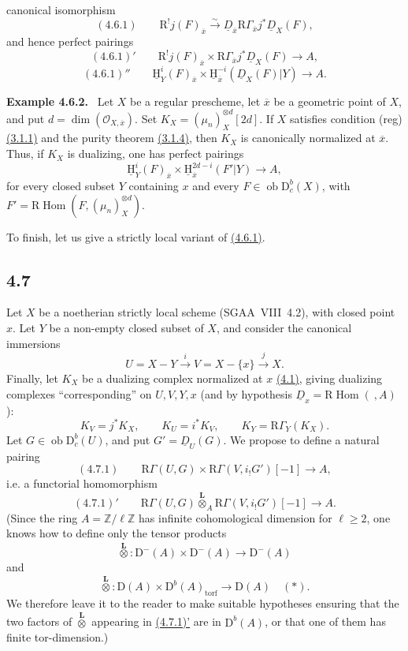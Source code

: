 \documentclass[11pt]{article}
\providecommand{\cO}{\mathcal{O}}
\providecommand{\uH}{\underline{\mathrm H}}
\newenvironment{statement}[1]{\par\medskip\noindent\textbf{#1.}\ }{\par\medskip}
\DeclareMathOperator{\Hom}{Hom}
\newcommand{\R}{\mathrm{R}}
\newcommand{\D}{\mathrm{D}}
\newcommand{\Z}{\mathbb{Z}}
\newcommand{\ob}{\operatorname{ob}}
\newcommand{\ol}[1]{\overline{#1}}
\providecommand{\Hom}{\operatorname{Hom}}
\providecommand{\ob}{\operatorname{ob}}
\providecommand{\R}{\mathrm R}
\providecommand{\Z}{\mathbb Z}
\providecommand{\Hom}{\operatorname{Hom}}
\begin{document}
canonical isomorphism
\label{sga5:I:equation:4.6.1}\[
(4.6.1)\qquad \R^{!}j(F)_{\ol{x}}\xrightarrow{\sim}\underline{D}_{\ol{x}}\R\Gamma_{\ol{x}}j^*\underline{D}_X(F),
\]
and hence perfect pairings
\label{sga5:I:equation:4.6.1:2}\[
(4.6.1)'\qquad \R^{!}j(F)_{\ol{x}}\times \R\Gamma_{\ol{x}}j^*\underline{D}_X(F)\longrightarrow A,
\]
\label{sga5:I:equation:4.6.1:3}\[
(4.6.1)''\qquad \uH_Y^i(F)_{\ol{x}}\times \uH_{\ol{x}}^{-i}(\underline{D}_X(F)|Y)\longrightarrow A.
\]

\label{sga5:I:example:4.6.2}\begin{statement}{Example 4.6.2}
Let $X$ be a regular prescheme, let $\ol{x}$ be a geometric point of $X$, and put $d=\dim(\cO_{X,\ol{x}})$. Set $K_X=(\mu_n)_X^{\otimes d}[2d]$. If $X$ satisfies condition (reg) \hyperref[sga5:I:statement:3.1.1]{(3.1.1)} and the purity theorem \hyperref[sga5:I:statement:3.1.4]{(3.1.4)}, then $K_X$ is canonically normalized at $\ol{x}$. Thus, if $K_X$ is dualizing, one has perfect pairings
\[
\uH_Y^i(F)_{\ol{x}}\times \uH_{\ol{x}}^{2d-i}(F'|Y)\longrightarrow A,
\]
for every closed subset $Y$ containing $x$ and every $F\in\ob\D_c^b(X)$, with $F'=\R\Hom(F,(\mu_n)_X^{\otimes d})$.
\end{statement}

To finish, let us give a strictly local variant of \hyperref[sga5:I:equation:4.6.1]{(4.6.1)}.

\subsection*{4.7}\label{sga5:I:subsection:4.7}
Let $X$ be a noetherian strictly local scheme (SGAA~VIII~4.2), with closed point $x$. Let $Y$ be a non-empty closed subset of $X$, and consider the canonical immersions
\[
U=X-Y\xrightarrow{i}V=X-\{x\}\xrightarrow{j}X.
\]
Finally, let $K_X$ be a dualizing complex normalized at $x$ \hyperref[sga5:I:equation:4.1]{(4.1)}, giving dualizing complexes ``corresponding'' on $U,V,Y,x$ (and by hypothesis $\underline{D}_x=\R\Hom(\ ,A)$):
\[
K_V=j^*K_X,
\qquad K_U=i^*K_V,
\qquad K_Y=\R\Gamma_Y(K_X).
\]
Let $G\in\ob\D_c^b(U)$, and put $G'=\underline{D}_U(G)$. We propose to define a natural pairing
\label{sga5:I:equation:4.7.1}\[
(4.7.1)\qquad \R\Gamma(U,G)\times \R\Gamma(V,i_!G')[-1]\longrightarrow A,
\]
i.e. a functorial homomorphism
\label{sga5:I:equation:4.7.1:2}\[
(4.7.1)'\qquad \R\Gamma(U,G)\overset{\mathbf L}{\otimes}_A\R\Gamma(V,i_!G')[-1]\longrightarrow A.
\]
(Since the ring $A=\Z/\ell\Z$ has infinite cohomological dimension for $\ell\geqslant2$, one knows how to define only the tensor products
\[
\overset{\mathbf L}{\otimes}:\D^-(A)\times\D^-(A)\longrightarrow\D^-(A)
\]
and
\[
\overset{\mathbf L}{\otimes}:\D(A)\times\D^b(A)_{\mathrm{torf}}\longrightarrow\D(A)\quad(*).
\]
We therefore leave it to the reader to make suitable hypotheses ensuring that the two factors of $\overset{\mathbf L}{\otimes}$ appearing in \hyperref[sga5:I:equation:4.7.1:2]{(4.7.1)'} are in $\D^b(A)$, or that one of them has finite tor-dimension.)
\end{document}

